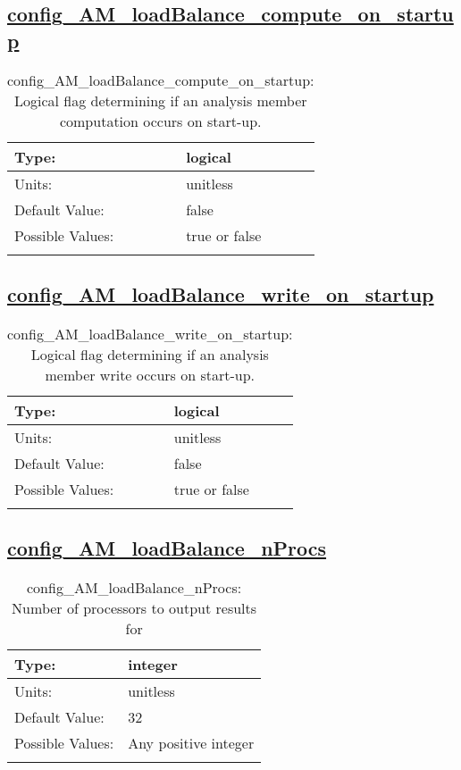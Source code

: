 \subsection[config\_AM\_loadBalance\_compute\_on\_startup]{\hyperref[sec:nm_tab_AM_loadBalance]{config\_AM\_loadBalance\_compute\_on\_startup}}
\label{subsec:nm_sec_config_AM_loadBalance_compute_on_startup}
\begin{center}
\begin{longtable}{| p{2.0in} || p{4.0in} |}
    \hline
    Type: & logical \\
    \hline
    Units: & \si{unitless} \\
    \hline
    Default Value: & false \\
    \hline
    Possible Values: & true or false \\
    \hline
    \caption{config\_AM\_loadBalance\_compute\_on\_startup: Logical flag determining if an analysis member computation occurs on start-up.}
\end{longtable}
\end{center}
\subsection[config\_AM\_loadBalance\_write\_on\_startup]{\hyperref[sec:nm_tab_AM_loadBalance]{config\_AM\_loadBalance\_write\_on\_startup}}
\label{subsec:nm_sec_config_AM_loadBalance_write_on_startup}
\begin{center}
\begin{longtable}{| p{2.0in} || p{4.0in} |}
    \hline
    Type: & logical \\
    \hline
    Units: & \si{unitless} \\
    \hline
    Default Value: & false \\
    \hline
    Possible Values: & true or false \\
    \hline
    \caption{config\_AM\_loadBalance\_write\_on\_startup: Logical flag determining if an analysis member write occurs on start-up.}
\end{longtable}
\end{center}
\subsection[config\_AM\_loadBalance\_nProcs]{\hyperref[sec:nm_tab_AM_loadBalance]{config\_AM\_loadBalance\_nProcs}}
\label{subsec:nm_sec_config_AM_loadBalance_nProcs}
\begin{center}
\begin{longtable}{| p{2.0in} || p{4.0in} |}
    \hline
    Type: & integer \\
    \hline
    Units: & \si{unitless} \\
    \hline
    Default Value: & 32 \\
    \hline
    Possible Values: & Any positive integer \\
    \hline
    \caption{config\_AM\_loadBalance\_nProcs: Number of processors to output results for}
\end{longtable}
\end{center}
